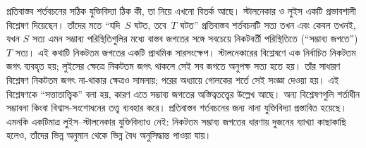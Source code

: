 \documentclass[../../../include/open-logic-section]{subfiles}
\begin{document}
প্রতিবাস্তব শর্তবচনের সঠিক যুক্তিবিদ্যা ঠিক কী, তা নিয়ে
এখনো বিতর্ক আছে। স্টালনেকার ও লুইস একটি প্রভাবশালী
বিশ্লেষণ দিয়েছেন। তাঁদের মতে ``যদি~$S$ ঘটত, তবে~$T$
ঘটত'' প্রতিবাস্তব শর্তবচনটি সত্য তখন এবং কেবল তখনই, যখন $S$ সত্য
এমন সম্ভাব্য পরিস্থিতিগুলির মধ্যে বাস্তব জগতের সঙ্গে
সবচেয়ে নিকটবর্তী পরিস্থিতিতে (``সম্ভাব্য জগতে'') $T$
সত্য।
এই কথাটি নিকটতম জগতের একটি প্রাথমিক সারসংক্ষেপ।
স্টালনেকারের বিশ্লেষণে এক নির্বাচিত নিকটতম জগৎ ব্যবহৃত হয়;
লুইসের ক্ষেত্রে নিকটতম জগৎ থাকলে সেই সব জগতে অনুপক্ষ
সত্য হতে হয়। তাঁর সাধারণ বিশ্লেষণ নিকটতম জগৎ না-থাকার
ক্ষেত্রও সামলায়; পরের অধ্যায়ে গোলকের শর্তে সেই সংজ্ঞা দেওয়া
হয়। এই বিশ্লেষণকে ``সত্তাতাত্ত্বিক'' বলা হয়, কারণ
এতে সম্ভাব্য জগতের অস্তিত্বতত্ত্বের উল্লেখ আছে। অন্য
বিশ্লেষণগুলি শর্তাধীন সম্ভাবনা কিংবা বিশ্বাস-সংশোধনের
তত্ত্ব ব্যবহার করে। প্রতিবাস্তব শর্তবচনের জন্য নানা
যুক্তিবিদ্যা প্রস্তাবিত হয়েছে। এমনকি একটিমাত্র
লুইস--স্টালনেকার যুক্তিবিদ্যাও নেই: নিকটতম সম্ভাব্য
জগতের ধারণায় দুজনের ব্যাখ্যা কাছাকাছি হলেও, তাঁদের
ভিন্ন অনুমান থেকে ভিন্ন বৈধ অনুসিদ্ধান্ত পাওয়া যায়।
\end{document}
